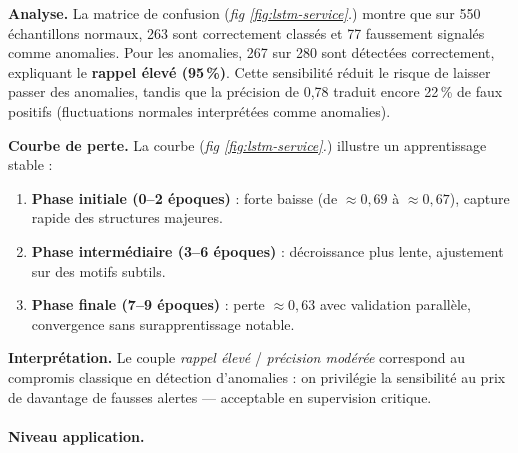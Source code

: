 \documentclass[conference]{IEEEtran}
\begin{document}
\textbf{Analyse.}
La matrice de confusion (\textit{fig \ref{fig:lstm-service}.}) montre que sur 550 échantillons normaux, 263 sont correctement classés et 77 faussement signalés comme anomalies.  
Pour les anomalies, 267 sur 280 sont détectées correctement, expliquant le \textbf{rappel élevé (95\,\%)}.  
Cette sensibilité réduit le risque de laisser passer des anomalies, tandis que la précision de 0{,}78 traduit encore 22\,\% de faux positifs (fluctuations normales interprétées comme anomalies).

\textbf{Courbe de perte.}
La courbe (\textit{fig \ref{fig:lstm-service}.}) illustre un apprentissage stable :
\begin{enumerate}
    \item \textbf{Phase initiale (0--2 époques)} : forte baisse (de $\approx 0{,}69$ à $\approx 0{,}67$), capture rapide des structures majeures.
    \item \textbf{Phase intermédiaire (3--6 époques)} : décroissance plus lente, ajustement sur des motifs subtils.
    \item \textbf{Phase finale (7--9 époques)} : perte $\approx 0{,}63$ avec validation parallèle, convergence sans surapprentissage notable.
\end{enumerate}

\textbf{Interprétation.}
Le couple \textit{rappel élevé} / \textit{précision modérée} correspond au compromis classique en détection d’anomalies : on privilégie la sensibilité au prix de davantage de fausses alertes — acceptable en supervision critique.

\paragraph{Niveau application.}
\end{document}
